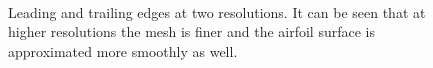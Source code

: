 \documentclass[12pt, a4paper]{article}
\begin{document}
\begin{figure}[htbp]
    \centering
     \qquad
     \\
     \qquad
    \caption{Leading and trailing edges at two resolutions. It can be seen that at higher resolutions the mesh is finer and the airfoil surface is approximated more smoothly as well.}
    \label{fig_mesh_edges}
\end{figure}
\end{document}
